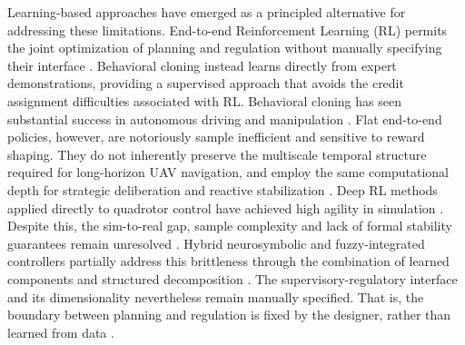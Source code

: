 \documentclass[12pt, a4paper]{article}
\begin{document}
Learning-based approaches have emerged as a principled alternative for addressing these limitations.
End-to-end Reinforcement Learning (RL) permits the joint optimization of planning and regulation without manually specifying their interface \parencite{almahamid_reinforcement_2021, levine_end--end_2016, kiran_deep_2022, shakya_reinforcement_2023}.
Behavioral cloning instead learns directly from expert demonstrations, providing a supervised approach that avoids the credit assignment difficulties associated with RL.
Behavioral cloning has seen substantial success in autonomous driving and manipulation \parencite{levine_end--end_2016, le_mero_survey_2022, ly_learning_2021, block_is_2024}.
Flat end-to-end policies, however, are notoriously sample inefficient and sensitive to reward shaping.
They do not inherently preserve the multiscale temporal structure required for long-horizon UAV navigation, and employ the same computational depth for strategic deliberation and reactive stabilization \parencite{almahamid_reinforcement_2021, agyei_deep_2025}.
Deep RL methods applied directly to quadrotor control have achieved high agility in simulation \parencite{trad_real-time_2024, saviolo_learning_2023}.
Despite this, the sim-to-real gap, sample complexity and lack of formal stability guarantees remain unresolved \parencite{dai_lyapunov-stable_2021, agyei_deep_2025}.
Hybrid neurosymbolic and fuzzy-integrated controllers partially address this brittleness through the combination of learned components and structured decomposition \parencite{tang_fuzzy_2024, mahmoud_fractional-order_2024, tran_hybrid_2021, baheri_hierarchical_2025}.
The supervisory-regulatory interface and its dimensionality nevertheless remain manually specified.
That is, the boundary between planning and regulation is fixed by the designer, rather than learned from data \parencite{borri_design_2019, yu_survey_2023}.
 
\end{document}
